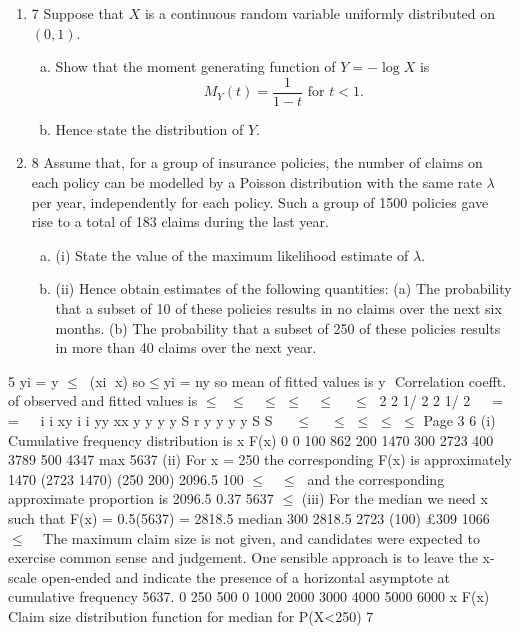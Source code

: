 \documentclass[a4paper,12pt]{article}
\begin{document}
\begin{enumerate}
\item 7 Suppose that $X$ is a continuous random variable uniformly distributed on $(0, 1)$.
\begin{enumerate}[(a)]
    \item  Show that the moment generating function of $Y = - \log X$ is
\[M_Y(t) = \frac{1}{1 - t} \mbox{ for } t < 1.\] 
    \item Hence state the distribution of $Y$. 
\end{enumerate}
\item 8 Assume that, for a group of insurance policies, the number of claims on each policy
can be modelled by a Poisson distribution with the same rate $\lambda$ per year,
independently for each policy. Such a group of 1500 policies gave rise to a total of
183 claims during the last year.
\begin{enumerate}[(a)]
    \item (i) State the value of the maximum likelihood estimate of $\lambda$.
\item (ii) Hence obtain estimates of the following quantities:
(a) The probability that a subset of 10 of these policies results in no claims
over the next six months.
(b) The probability that a subset of 250 of these policies results in more
than 40 claims over the next year. 
\end{enumerate}
\end{enumerate}
\newpage

5 yi = y $\leq$(xi  x) so$\leq$yi = ny so mean of fitted values is y
 Correlation coefft. of observed and fitted values is
$\leq$ $\leq$ 
$\leq$ $\leq$  $\leq$   $\leq$  2 2 1/ 2 2 1/ 2
 
= =
 
i i xy
i i yy xx
y y y y S
r
y y y y S S
  $\leq$
  $\leq$
$\leq$
$\leq$ $\leq$
Page 3
6 (i) Cumulative frequency distribution is
x F(x)
0 0
100 862
200 1470
300 2723
400 3789
500 4347
max 5637
(ii) For x = 250 the corresponding F(x) is approximately
1470 (2723 1470) (250 200) 2096.5
100
$\leq$
 $\leq$ 
and the corresponding approximate proportion is 2096.5 0.37
5637
$\leq$
(iii) For the median we need x such that F(x) = 0.5(5637) = 2818.5
median 300 2818.5 2723 (100) £309
1066
$\leq$
  
The maximum claim size is not given, and candidates were expected to exercise common
sense and judgement. One sensible approach is to leave the x-scale open-ended and indicate
the presence of a horizontal asymptote at cumulative frequency 5637.
0 250 500
0
1000
2000
3000
4000
5000
6000
x
F(x)
Claim size distribution function
for median
for P(X<250)
7 
\end{document}
